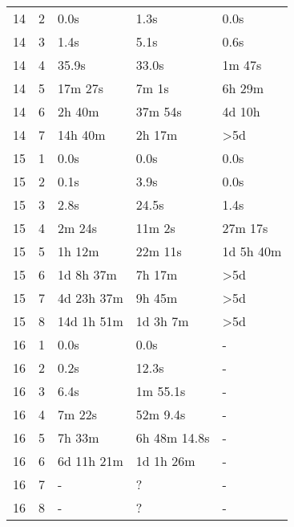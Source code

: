 \documentclass[twoside,leqno,twocolumn]{article}
\begin{document}
\begin{table}[!t]
\begin{tabular}{c|c|l|l|l}
    14  & 2   & 0.0s             & 1.3s              & 0.0s             \\
    14  & 3   & 1.4s             & 5.1s              & 0.6s             \\
    14  & 4   & 35.9s            & 33.0s             & 1m 47s           \\
    14  & 5   & 17m 27s          & 7m 1s             & 6h 29m           \\
    14  & 6   & 2h 40m           & 37m 54s           & 4d 10h           \\
    14  & 7   & 14h 40m          & 2h 17m            & >5d              \\
    \hline
    15  & 1   & 0.0s             & 0.0s              & 0.0s             \\
    15  & 2   & 0.1s             & 3.9s              & 0.0s             \\
    15  & 3   & 2.8s             & 24.5s             & 1.4s             \\
    15  & 4   & 2m 24s           & 11m 2s            & 27m 17s          \\
    15  & 5   & 1h 12m           & 22m 11s           & 1d 5h 40m        \\
    15  & 6   & 1d 8h 37m        & 7h 17m            & >5d              \\
    15  & 7   & 4d 23h 37m       & 9h 45m            & >5d              \\
    15  & 8   & 14d 1h 51m       & 1d 3h 7m          & >5d              \\
    \hline
    16  & 1   & 0.0s             & 0.0s              & -                \\
    16  & 2   & 0.2s             & 12.3s             & -                \\
    16  & 3   & 6.4s             & 1m 55.1s          & -                \\
    16  & 4   & 7m 22s           & 52m 9.4s          & -                \\
    16  & 5   & 7h 33m           & 6h 48m 14.8s      & -                \\
    16  & 6   & 6d 11h 21m       & 1d 1h 26m         & -                \\
    16  & 7   & -                & ?                 & -                \\
    16  & 8   & -                & ?                 & -                \\
  \end{tabular}
\end{table}
\end{document}
